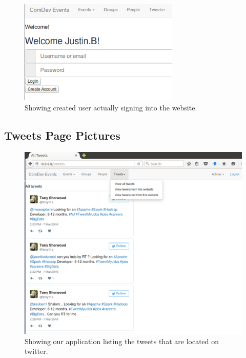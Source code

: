 \documentclass[draftclsnofoot,10pt,onecolumn]{IEEEtran} %
\begin{document}
\begin{figure}[H]
  \begin{center}
  
  \includegraphics[width=3in, frame]{loginSuccess}
  \captionsetup{width=.4\linewidth}
  \centering
  \caption{Showing created user actually signing into the website. }

  \end{center}
\end{figure}

\subsection{Tweets Page Pictures}

\begin{figure}[H]
  \begin{center}
  
  \includegraphics[width=6in, frame]{listingTweets}
  \captionsetup{width=.4\linewidth}
  \centering
  \caption{Showing our application listing the tweets that are located on twitter. }

  \end{center}
\end{figure}
\end{document}
